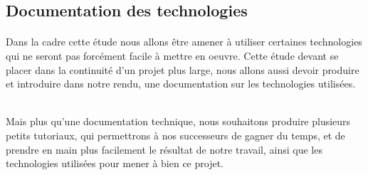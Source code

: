 \subsection{Documentation des technologies}
\paragraph{} Dans la cadre cette étude nous allons être amener à utiliser certaines technologies qui ne seront pas forcément facile à mettre en oeuvre. Cette étude devant se placer dans la continuité d'un projet plus large, nous allons aussi devoir produire et introduire dans notre rendu, une documentation sur les technologies utilisées.
\\\\\indent

Mais plus qu'une documentation technique, nous souhaitons produire plusieurs petits tutoriaux, qui permettrons à nos successeurs de gagner du temps, et de prendre en main plus facilement le résultat de notre travail, ainsi que les technologies utilisées pour mener à bien ce projet.
\newpage